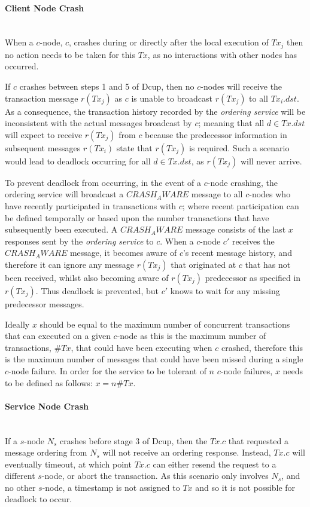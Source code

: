 	\paragraph{Client Node Crash} \hspace{0pt} \\
	When a $c$-node, $c$, crashes during or directly after the local execution of $Tx_j$ then no action needs to be taken for this $Tx$, as no interactions with other nodes has occurred.  
	
	If $c$ crashes between steps 1 and 5 of \textsf{Dcup}, then no $c$-nodes will receive the transaction message $r(Tx_j)$ as $c$ is unable to broadcast $r(Tx_j)$ to all $Tx_i.dst$.  As a consequence, the transaction history recorded by the \emph{ordering service} will be inconsistent with the actual messages broadcast by $c$; meaning that all $d \in Tx.dst$ will expect to receive $r(Tx_j)$ from $c$ because the predecessor information in subsequent messages $r(Tx_i)$ state that $r(Tx_j)$ is required.  Such a scenario would lead to deadlock occurring for all $d \in Tx.dst$, as $r(Tx_j)$ will never arrive.  
	
	To prevent deadlock from occurring, in the event of a $c$-node crashing, the ordering service will broadcast a $CRASH_AWARE$ message to all $c$-nodes who have recently participated in transactions with $c$; where recent participation can be defined temporally or based upon the number transactions that have subsequently been executed.  A $CRASH_AWARE$ message consists of the last $x$ responses sent by the \emph{ordering service} to $c$.  When a $c$-node $c'$ receives the $CRASH_AWARE$ message, it becomes aware of $c$'s recent message history, and therefore it can ignore any message $r(Tx_j)$ that originated at $c$ that has not been received, whilst also becoming aware of $r(Tx_j)$ predecessor as specified in $r(Tx_j)$. Thus deadlock is prevented, but $c'$ knows to wait for any missing predecessor messages.  
	
	Ideally $x$ should be equal to the maximum number of concurrent transactions that can executed on a given $c$-node as this is the maximum number of transactions, $\#Tx$, that could have been executing when $c$ crashed, therefore this is the maximum number of messages that could have been missed during a single $c$-node failure.  In order for the service to be tolerant of $n$ $c$-node failures, $x$ needs to be defined as follows: $x = n\#Tx$.  
	    
	\paragraph{Service Node Crash} \hspace{0pt} \\
	If a $s$-node $N_s$ crashes before stage 3 of \textsf{Dcup}, then the $Tx.c$ that requested a message ordering from $N_s$ will not receive an ordering response.  Instead, $Tx.c$ will eventually timeout, at which point $Tx.c$ can either resend the request to a different $s$-node, or abort the transaction.  As this scenario only involves $N_s$, and no other $s$-node, a timestamp is not assigned to $Tx$ and so it is not possible for deadlock to occur.  
	
